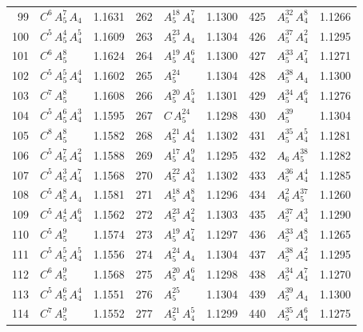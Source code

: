\begin{longtable}{@{}rlr@{\quad}rlr@{\quad}rlr@{}}
99 & $C^{6}$\,$A_{5}^{7}$\,$A_{4}$ & 1.1631 & 262 & $A_{5}^{18}$\,$A_{4}^{7}$ & 1.1300 & 425 & $A_{5}^{32}$\,$A_{4}^{8}$ & 1.1266 \\
100 & $C^{5}$\,$A_{5}^{4}$\,$A_{4}^{5}$ & 1.1609 & 263 & $A_{5}^{23}$\,$A_{4}$ & 1.1304 & 426 & $A_{5}^{37}$\,$A_{4}^{2}$ & 1.1295 \\
101 & $C^{6}$\,$A_{5}^{8}$ & 1.1624 & 264 & $A_{5}^{19}$\,$A_{4}^{6}$ & 1.1300 & 427 & $A_{5}^{33}$\,$A_{4}^{7}$ & 1.1271 \\
102 & $C^{5}$\,$A_{5}^{5}$\,$A_{4}^{4}$ & 1.1602 & 265 & $A_{5}^{24}$ & 1.1304 & 428 & $A_{5}^{38}$\,$A_{4}$ & 1.1300 \\
103 & $C^{7}$\,$A_{5}^{8}$ & 1.1608 & 266 & $A_{5}^{20}$\,$A_{4}^{5}$ & 1.1301 & 429 & $A_{5}^{34}$\,$A_{4}^{6}$ & 1.1276 \\
104 & $C^{5}$\,$A_{5}^{6}$\,$A_{4}^{3}$ & 1.1595 & 267 & $C$\,$A_{5}^{24}$ & 1.1298 & 430 & $A_{5}^{39}$ & 1.1304 \\
105 & $C^{8}$\,$A_{5}^{8}$ & 1.1582 & 268 & $A_{5}^{21}$\,$A_{4}^{4}$ & 1.1302 & 431 & $A_{5}^{35}$\,$A_{4}^{5}$ & 1.1281 \\
106 & $C^{5}$\,$A_{5}^{7}$\,$A_{4}^{2}$ & 1.1588 & 269 & $A_{5}^{17}$\,$A_{4}^{9}$ & 1.1295 & 432 & $A_{6}$\,$A_{5}^{38}$ & 1.1282 \\
107 & $C^{5}$\,$A_{5}^{3}$\,$A_{4}^{7}$ & 1.1568 & 270 & $A_{5}^{22}$\,$A_{4}^{3}$ & 1.1302 & 433 & $A_{5}^{36}$\,$A_{4}^{4}$ & 1.1285 \\
108 & $C^{5}$\,$A_{5}^{8}$\,$A_{4}$ & 1.1581 & 271 & $A_{5}^{18}$\,$A_{4}^{8}$ & 1.1296 & 434 & $A_{6}^{2}$\,$A_{5}^{37}$ & 1.1260 \\
109 & $C^{5}$\,$A_{5}^{4}$\,$A_{4}^{6}$ & 1.1562 & 272 & $A_{5}^{23}$\,$A_{4}^{2}$ & 1.1303 & 435 & $A_{5}^{37}$\,$A_{4}^{3}$ & 1.1290 \\
110 & $C^{5}$\,$A_{5}^{9}$ & 1.1574 & 273 & $A_{5}^{19}$\,$A_{4}^{7}$ & 1.1297 & 436 & $A_{5}^{33}$\,$A_{4}^{8}$ & 1.1265 \\
111 & $C^{5}$\,$A_{5}^{5}$\,$A_{4}^{5}$ & 1.1556 & 274 & $A_{5}^{24}$\,$A_{4}$ & 1.1304 & 437 & $A_{5}^{38}$\,$A_{4}^{2}$ & 1.1295 \\
112 & $C^{6}$\,$A_{5}^{9}$ & 1.1568 & 275 & $A_{5}^{20}$\,$A_{4}^{6}$ & 1.1298 & 438 & $A_{5}^{34}$\,$A_{4}^{7}$ & 1.1270 \\
113 & $C^{5}$\,$A_{5}^{6}$\,$A_{4}^{4}$ & 1.1551 & 276 & $A_{5}^{25}$ & 1.1304 & 439 & $A_{5}^{39}$\,$A_{4}$ & 1.1300 \\
114 & $C^{7}$\,$A_{5}^{9}$ & 1.1552 & 277 & $A_{5}^{21}$\,$A_{4}^{5}$ & 1.1299 & 440 & $A_{5}^{35}$\,$A_{4}^{6}$ & 1.1275 \\

\end{longtable}
